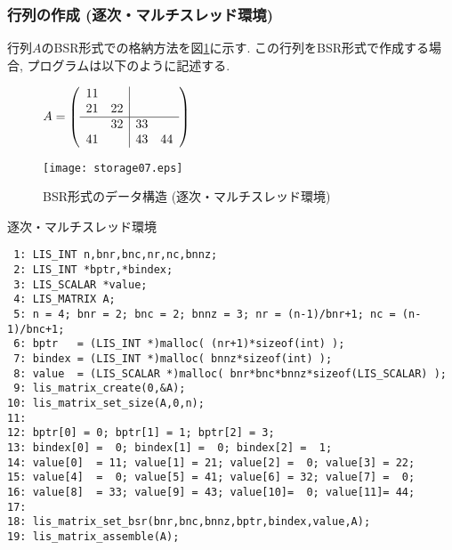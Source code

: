 \documentclass[a4paper]{jarticle}
\begin{document}
{{\subsubsection{行列の作成 (逐次・マルチスレッド環境)}
行列$A$のBSR形式での格納方法を図\ref{fig:storage07}に示す. 
この行列をBSR形式で作成する場合, プログラムは以下のように記述する. 
\begin{figure}[h]
{\centering 
\begin{minipage}{0.3\textwidth}
\begin{flushright}
$ 
A = \left(
\begin{array}{cc|cc}
11 &    &    &    \\
21 & 22 &    &    \\ \hline
   & 32 & 33 &    \\
41 &    & 43 & 44 \\
\end{array}\right)
$
\end{flushright}
\end{minipage}
\begin{minipage}{0.6\textwidth}
\begin{flushleft}
\texttt{[image: storage07.eps]} 
\end{flushleft}
\end{minipage}
\caption{BSR形式のデータ構造 (逐次・マルチスレッド環境)}\label{fig:storage07}}
\end{figure}
\begin{itembox}[l]{逐次・マルチスレッド環境}
\small
\begin{verbatim}
 1: LIS_INT n,bnr,bnc,nr,nc,bnnz;
 2: LIS_INT *bptr,*bindex;
 3: LIS_SCALAR *value;
 4: LIS_MATRIX A;
 5: n = 4; bnr = 2; bnc = 2; bnnz = 3; nr = (n-1)/bnr+1; nc = (n-1)/bnc+1;
 6: bptr   = (LIS_INT *)malloc( (nr+1)*sizeof(int) );
 7: bindex = (LIS_INT *)malloc( bnnz*sizeof(int) );
 8: value  = (LIS_SCALAR *)malloc( bnr*bnc*bnnz*sizeof(LIS_SCALAR) );
 9: lis_matrix_create(0,&A);
10: lis_matrix_set_size(A,0,n);
11:
12: bptr[0] = 0; bptr[1] = 1; bptr[2] = 3;
13: bindex[0] =  0; bindex[1] =  0; bindex[2] =  1;
14: value[0]  = 11; value[1] = 21; value[2] =  0; value[3] = 22;
15: value[4]  =  0; value[5] = 41; value[6] = 32; value[7] =  0;
16: value[8]  = 33; value[9] = 43; value[10]=  0; value[11]= 44;
17:
18: lis_matrix_set_bsr(bnr,bnc,bnnz,bptr,bindex,value,A);
19: lis_matrix_assemble(A);
\end{verbatim}
\end{itembox}

\newpage
}}
\end{document}
